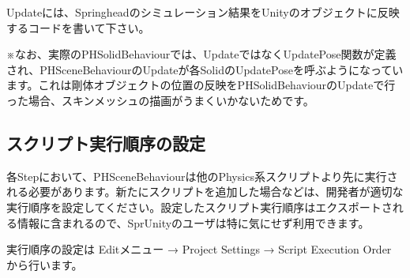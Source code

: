 Updateには、Springheadのシミュレーション結果をUnityのオブジェクトに反映するコードを書いて下さい。

\KLUDGE ※なお、実際のPHSolidBehaviourでは、UpdateではなくUpdatePose関数が定義され、PHSceneBehaviourのUpdateが各SolidのUpdatePoseを呼ぶようになっています。これは剛体オブジェクトの位置の反映をPHSolidBehaviourのUpdateで行った場合、スキンメッシュの描画がうまくいかないためです。


\subsection{スクリプト実行順序の設定}

\KLUDGE 各Stepにおいて、PHSceneBehaviourは他のPhysics系スクリプトより先に実行される必要があります。新たにスクリプトを追加した場合などは、開発者が適切な実行順序を設定してください。設定したスクリプト実行順序はエクスポートされる情報に含まれるので、SprUnityのユーザは特に気にせず利用できます。

\KLUDGE 実行順序の設定は Editメニュー → Project Settings → Script Execution Order から行います。




